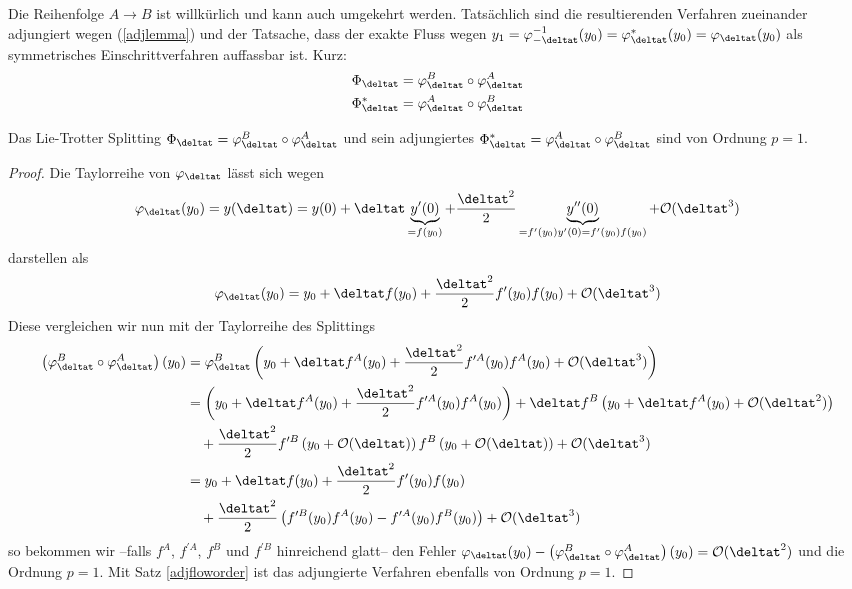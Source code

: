 \hfill%
\begin{minipage}{0.7\textwidth}
Die Reihenfolge $A\to B$ ist willkürlich und kann auch umgekehrt werden. Tatsächlich sind die resultierenden Verfahren zueinander adjungiert wegen (\ref{adjlemma}) und der Tatsache, dass der exakte Fluss wegen $y_1=\varphi_{-\deltat}^{-1}(y_0)=\varphi_{\deltat}^*(y_0)=\varphi_{\deltat}(y_0)$ als symmetrisches Einschrittverfahren auffassbar ist. Kurz:\\
\begin{align}
\label{liesplittings}
\Phi_{\deltat}=\varphi_{\deltat}^B \circ \varphi_{\deltat}^A\\
\Phi_{\deltat}^*=\varphi_{\deltat}^A \circ \varphi_{\deltat}^B\nonumber
\end{align} 
\end{minipage}

\begin{maththeorem}
\label{lieorder1}
Das Lie-Trotter Splitting $\Phi_{\deltat}=\varphi_{\deltat}^B \circ \varphi_{\deltat}^A$ und sein adjungiertes $\Phi_{\deltat}^*=\varphi_{\deltat}^A \circ \varphi_{\deltat}^B$ sind von Ordnung $p=1$.
\end{maththeorem}
\begin{proof}
Die Taylorreihe von $\varphi_{\deltat}$ lässt sich wegen 
\[\varphi_{\deltat}(y_0)=y(\deltat)=y(0)+\deltat \underbrace{y^\prime(0)}_{=f(y_0)}
+\frac{\deltat^2}{2}\underbrace{y^{\prime\prime}(0)}_{=f^\prime(y_0)y^\prime(0)=f^\prime(y_0)f(y_0)}+\mathcal{O}(\deltat^3)\] darstellen als 
\[\varphi_{\deltat}(y_0)=y_0+\deltat f(y_0)+\frac{\deltat^2}{2}f^\prime(y_0)f(y_0)+\mathcal{O}(\deltat^3)\]
Diese vergleichen wir nun mit der Taylorreihe des Splittings
\begin{align*}
\left(\varphi_{\deltat}^B \circ \varphi_{\deltat}^A\right)(y_0)&=
\varphi_{\deltat}^B\left(y_0+\deltat f^A(y_0)+\frac{\deltat^2}{2}f^{\prime A}(y_0)f^A(y_0)+\mathcal{O}(\deltat^3)\right)\\
&=\left(y_0+\deltat f^A(y_0)+\frac{\deltat^2}{2}f^{\prime A}(y_0)f^A(y_0)\right)
+\deltat f^B\left(y_0+\deltat f^A(y_0)+\mathcal{O}(\deltat^2)\right)\\
&\quad+\frac{\deltat^2}{2}f^{\prime B}\left(y_0+\mathcal{O}(\deltat)\right)f^B\left(y_0+\mathcal{O}(\deltat)\right)+\mathcal{O}(\deltat^3)\\
&=y_0+\deltat f(y_0)+\frac{\deltat^2}{2}f^\prime(y_0)f(y_0)\\
&\quad+\frac{\deltat^2}{2}\left(f^{\prime B}(y_0)f^A(y_0)-f^{\prime A}(y_0)f^B(y_0)\right)+\mathcal{O}(\deltat^3)
\end{align*}
so bekommen wir --falls $f^A$, $f^{\prime A}$, $f^B$ und $f^{\prime B}$ hinreichend glatt-- den Fehler $\varphi_{\deltat}(y_0)-\left(\varphi_{\deltat}^B \circ \varphi_{\deltat}^A\right)(y_0)=\mathcal{O}(\deltat^2)$ und die Ordnung $p=1$. Mit Satz \ref{adjfloworder} ist das adjungierte Verfahren ebenfalls von Ordnung $p=1$.
\end{proof}

